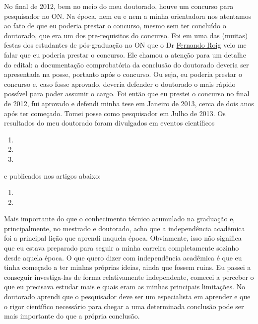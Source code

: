 No final de 2012, bem no meio do meu doutorado, houve um concurso para pesquisador no ON.
Na época, nem eu e nem a minha orientadora nos atentamos ao fato de que eu poderia 
prestar o concurso, mesmo sem ter concluído o doutorado, que era um dos pre-requisitos do
concurso. Foi em uma das (muitas) festas dos estudantes de pós-graduação no ON que
o Dr \href{https://lattes.cnpq.br/5822763057370791}{Fernando Roig} veio me falar que eu poderia prestar o concurso.
Ele chamou a atenção para um detalhe do edital: a documentação comprobatória da conclusão 
do doutorado deveria ser apresentada na posse, portanto após o concurso. 
Ou seja, eu poderia prestar o concurso e, caso fosse aprovado, deveria defender o doutorado
o mais rápido possível para poder assumir o cargo.
Foi então que eu prestei o concurso no final de 2012, fui aprovado e defendi minha tese em
Janeiro de 2013, cerca de dois anos após ter começado. Tomei posse como pesquisador
em Julho de 2013. Os resultados do meu doutorado foram divulgados em eventos científicos
\begin{enumerate}
	\item {}
	\item {}
	\item {}
\end{enumerate}
\noindent e publicados nos artigos abaixo:
\begin{enumerate}
	\item {}
	\item {}
\end{enumerate}

Mais importante do que o conhecimento técnico acumulado na graduação e, 
principalmente, no mestrado e doutorado, acho que a independência acadêmica 
foi a principal lição que aprendi naquela época.
Obviamente, isso não significa que eu estava preparado para seguir a minha 
carreira completamente sozinho desde aquela época. O que quero dizer com 
independência acadêmica é que eu tinha começado a ter minhas próprias ideias,
ainda que fossem ruins. Eu passei a conseguir investiga-las de forma 
relativamente independente, comecei a perceber o que eu precisava estudar 
mais e quais eram as minhas principais limitações.
No doutorado aprendi que o pesquisador deve ser um especialista em aprender
e que o rigor científico necessário para chegar a uma determinada conclusão pode ser
mais importante do que a própria conclusão.
